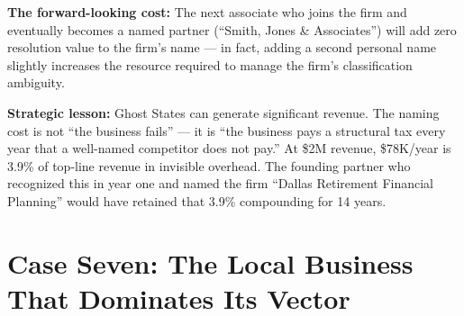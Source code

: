 \documentclass[12pt, openany]{book}
\theoremstyle{thmstyle}
\theoremstyle{defstyle}
\begin{document}
\begin{casebox}
\textbf{The forward-looking cost:} The next associate who joins the firm and eventually becomes a named partner (``Smith, Jones \& Associates'') will add zero resolution value to the firm's name --- in fact, adding a second personal name slightly increases the resource required to manage the firm's classification ambiguity.

\textbf{Strategic lesson:} Ghost States can generate significant revenue. The naming cost is not ``the business fails'' --- it is ``the business pays a structural tax every year that a well-named competitor does not pay.'' At \$2M revenue, \$78K/year is 3.9\% of top-line revenue in invisible overhead. The founding partner who recognized this in year one and named the firm ``Dallas Retirement Financial Planning'' would have retained that 3.9\% compounding for 14 years.
\end{casebox}

\section{Case Seven: The Local Business That Dominates Its Vector}
\end{document}
